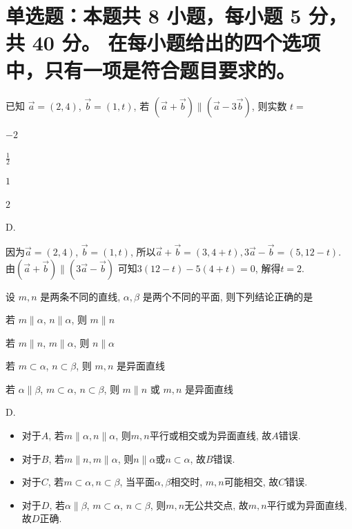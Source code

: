 \section{%
  单选题：本题共 8 小题，每小题 5 分，共 40 分。
  在每小题给出的四个选项中，只有一项是符合题目要求的。
}

\begin{question}
  已知 $\vec{a}=(2,4)$, $\vec{b}=(1,t)$, 若 $(\vec{a}+\vec{b})\parallel(\vec{a}-3\vec{b})$, 则实数 $t=$ \paren[D]

  \begin{choices}
    \item $-2$
    \item $\frac{1}{2}$
    \item $1$
    \item $2$
  \end{choices}

  \begin{solution}
    D.

    因为$\vec{a}=(2,4)$, $\vec{b}=(1,t)$, 所以$\vec{a} + \vec{b} = (3, 4+t), 3\vec{a} - \vec{b} = (5, 12-t)$. 由$(\vec{a} + \vec{b})\parallel(3\vec{a} - \vec{b})$ 可知$3(12-t) - 5(4+t) = 0$, 解得$t = 2$.
  \end{solution}
\end{question}

\begin{question}
  设 $m,n$ 是两条不同的直线, $\alpha,\beta$ 是两个不同的平面, 则下列结论正确的是 \paren[D]
  \begin{choices}
    \item 若 $m\parallel\alpha$, $n\parallel\alpha$, 则 $m\parallel n$
    \item 若 $m\parallel n$, $m\parallel\alpha$, 则 $n\parallel\alpha$
    \item 若 $m\subset\alpha$, $n\subset\beta$, 则 $m,n$ 是异面直线
    \item 若 $\alpha\parallel\beta$, $m\subset\alpha$, $n\subset\beta$, 则 $m\parallel n$ 或 $m,n$ 是异面直线
  \end{choices}

  \begin{solution}
    D.
    \begin{itemize}
      \item 对于$A$, 若$m\parallel\alpha, n\parallel\alpha$, 则$m, n$平行或相交或为异面直线, 故$A$错误.
      \item 对于$B$, 若$m\parallel n, m\parallel\alpha$, 则$n\parallel\alpha$或$n\subset\alpha$, 故$B$错误.
      \item 对于$C$, 若$m\subset\alpha, n\subset\beta$, 当平面$\alpha, \beta$相交时, $m, n$可能相交, 故$C$错误.
      \item 对于$D$, 若$\alpha\parallel\beta$, $m\subset\alpha$, $n\subset\beta$, 则$m, n$无公共交点, 故$m, n$平行或为异面直线, 故$D$正确.
    \end{itemize}
  \end{solution}
\end{question}

